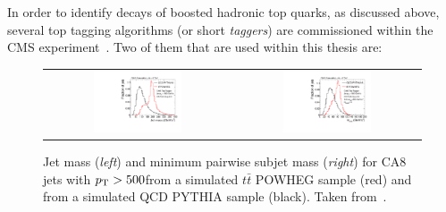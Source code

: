 In order to identify decays of boosted hadronic top quarks, as discussed above, several top tagging algorithms (or short \textit{taggers}) are commissioned within the CMS experiment~\cite{CMS:2014fya, CMS-DP-2014-036}. Two of them that are used within this thesis are:
\begin{description}
\begin{figure}[!tp]
  \centering 
  \begin{tabular}{cc}
    \includegraphics[width=0.49\textwidth]{figures/Draw2HistogramsFrom1File_QQ_MASS_CUT_PT_TT_MASS_CUT_PT_JetPt500.pdf} & 
    \includegraphics[width=0.49\textwidth]{figures/Draw2HistogramsFrom1File_QQ_MINM_CUT_PT_MASS_NSUB_TT_MINM_CUT_PT_MASS_NSUB_JetPt500.pdf}
  \end{tabular}
  \caption{Jet mass (\textit{left}) and minimum pairwise subjet mass (\textit{right}) for CA8 jets with $p_{\text{T}} > 500$\gev from a simulated $t\bar{t}$ POWHEG sample (red) and from a simulated QCD PYTHIA sample (black). Taken from~\cite{CMS:2014fya}.}
  \label{fig:boosted_top_cms_variables}
\end{figure}

\end{description}
